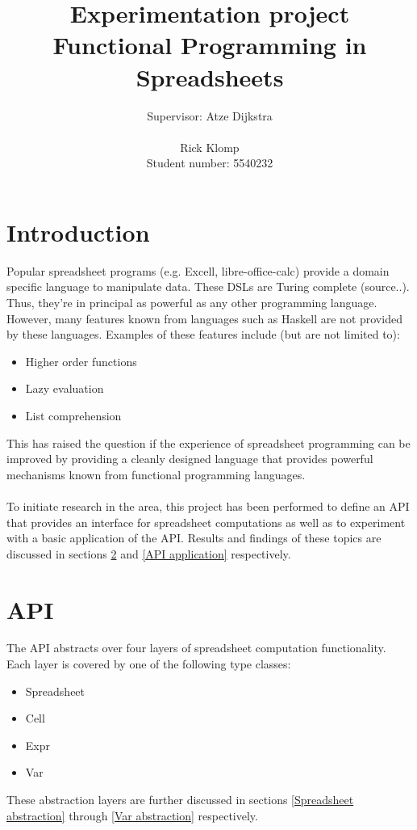 \documentclass[10pt,a4paper]{article}
\begin{document}
\author{Supervisor: Atze Dijkstra\\\\Rick Klomp\\Student number: 5540232}
\title{Experimentation project\\Functional Programming in Spreadsheets}
\maketitle
\pagebreak

\section{Introduction}
Popular spreadsheet programs (e.g. Excell, libre-office-calc) provide a
domain specific language to manipulate data. These DSLs are Turing complete (source..). Thus,
they're in principal as powerful as any other programming language.
However, many features known from languages such as Haskell are not provided by these languages.
Examples of these features include (but are not limited to):
\begin{itemize}
\item Higher order functions
\item Lazy evaluation
\item List comprehension
\end{itemize}
This has raised the question if the experience of spreadsheet programming can be improved by
providing a cleanly designed language that provides powerful mechanisms known from functional
programming languages.
\\\\
To initiate research in the area, this project has been performed to define an API that provides
an interface for spreadsheet computations as well as to experiment with a basic application of
the API. Results and findings of these topics are discussed in sections \ref{API} and
\ref{API application} respectively.

\section{API}
\label{API}
The API abstracts over four layers of spreadsheet computation functionality.
Each layer is covered by one of the following type classes:
\begin{itemize}
\item Spreadsheet
\item Cell
\item Expr
\item Var
\end{itemize}
These abstraction layers are further discussed in sections \ref{Spreadsheet abstraction} through
\ref{Var abstraction} respectively.
\end{document}
